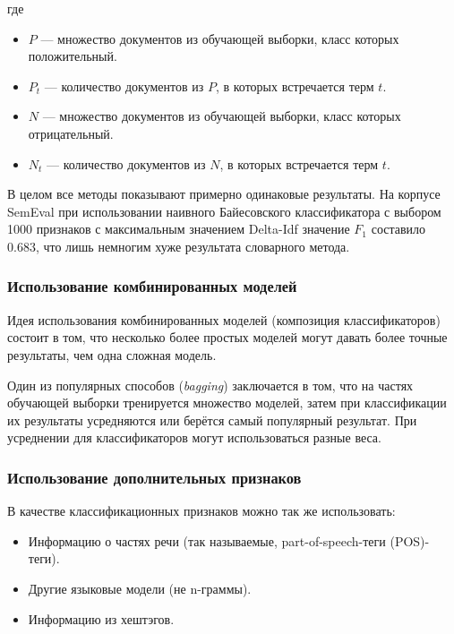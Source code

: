 \begin{enumerate}
где 
\begin{itemize}

\item
$P$ --- множество документов из обучающей выборки, класс которых положительный.

\item
$P_t$ --- количество документов из $P$, в которых встречается терм $t$.

\item
$N$ --- множество документов из обучающей выборки, класс которых отрицательный.

\item
$N_t$ --- количество документов из $N$, в которых встречается терм $t$.

\end{itemize}

\end{enumerate}

В целом все методы показывают примерно одинаковые результаты. 
На корпусе SemEval при использовании наивного
Байесовского классификатора с выбором 1000 признаков
с максимальным значением Delta-Idf значение $F_1$ составило 0.683, 
что лишь немногим хуже результата словарного метода. 

\subsubsection{Использование комбинированных моделей}
Идея использования комбинированных моделей (композиция классификаторов) состоит в том,
что несколько более простых моделей могут давать более точные результаты, чем одна сложная модель.

Один из популярных способов (\textit{bagging}) заключается в том, что
на частях обучающей выборки тренируется множество моделей,
затем при классификации их результаты усредняются или 
берётся самый популярный результат.
При усреднении для классификаторов могут использоваться разные веса.

\subsubsection{Использование дополнительных признаков}
В качестве классификационных признаков можно так же использовать:
\begin{itemize}

\item
Информацию о частях речи (так называемые, part-of-speech-теги (POS)-теги).

\item
Другие языковые модели (не n-граммы).

\item
Информацию из хештэгов.

\end{itemize}